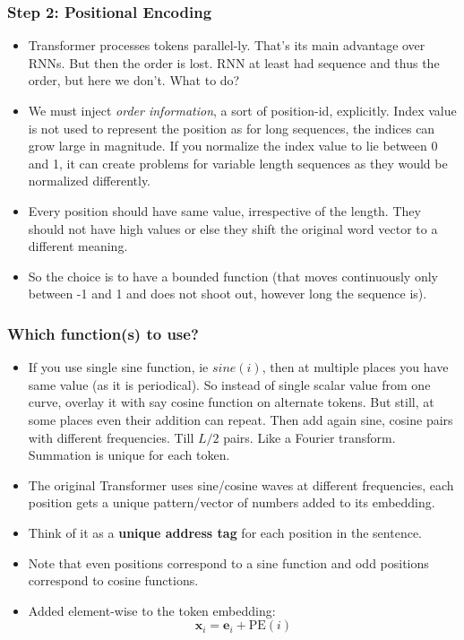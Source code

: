 \begin{frame}[fragile]\frametitle{Step 2: Positional Encoding}
\begin{itemize}
\item Transformer processes tokens parallel-ly. That's its main advantage over RNNs. But then the order is lost. RNN  at least had sequence and thus the order, but here we don't. What to do?
\item We must inject \emph{order information}, a sort of position-id, explicitly. Index value is not used to represent the position as for long sequences, the indices can grow large in magnitude. If you normalize the index value to lie between 0 and 1, it can create problems for variable length sequences as they would be normalized differently.
\item Every position should have same value, irrespective of the length. They should not have high values or else they shift the original word vector to a different meaning.
\item So the choice is to have a bounded function (that moves continuously only between -1 and 1 and does not shoot out, however long the sequence is).

\end{itemize}


\end{frame}

\begin{frame}[fragile]\frametitle{Which function(s) to use?}
\begin{itemize}
\item If you use single sine function, ie $sine(i)$, then at multiple places you have same value (as it is periodical). So instead of single scalar value from one curve, overlay it with say cosine function on alternate tokens. But still, at some places even their addition can repeat. Then add again sine, cosine pairs with different frequencies. Till $L/2$ pairs. Like a Fourier transform. Summation is unique for each token.
\item The original Transformer uses sine/cosine waves at different frequencies,  each position gets a unique pattern/vector of numbers added to its embedding.
\item Think of it as a \textbf{unique address tag} for each position in the sentence.
\item  Note that even positions correspond to a sine function and odd positions correspond to cosine functions.
\item Added element-wise to the token embedding:
\[
  \mathbf{x}_i = \mathbf{e}_i + \text{PE}(i)
\]
\end{itemize}


\end{frame}

